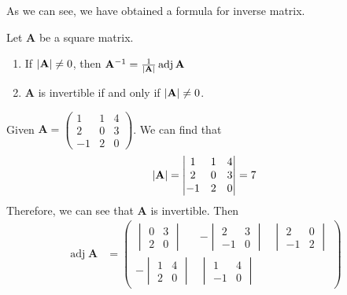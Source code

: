\documentclass{huhtakm-template-book}
\DeclareMathOperator{\adj}{adj}
\begin{document}
As we can see, we have obtained a formula for inverse matrix.
\begin{thm}
    Let $\mathbf{A}$ be a square matrix.
    \begin{enumerate}
        \item If $\left|{\mathbf{A}}\right|\neq 0$, then $\mathbf{A}^{-1}=\frac{1}{\abs{\mathbf{A}}}\adj\mathbf{A}$
        \item $\mathbf{A}$ is invertible if and only if $\left|{\mathbf{A}}\right|\neq 0$.
    \end{enumerate}
\end{thm}
\begin{eg}
    Given $\mathbf{A}=\begin{pmatrix}
        1 & 1 & 4\\
        2 & 0 & 3\\
        -1 & 2 & 0
    \end{pmatrix}$. We can find that
    \begin{equation*}
        \left|{\mathbf{A}}\right|=\begin{vmatrix}
        1 & 1 & 4\\
        2 & 0 & 3\\
        -1 & 2 & 0
        \end{vmatrix}=7
    \end{equation*}
    Therefore, we can see that $\mathbf{A}$ is invertible. Then
    \begin{align*}
        \adj\mathbf{A}&=\begin{pmatrix}
            \begin{vmatrix}
                0 & 3\\
                2 & 0
            \end{vmatrix} & -\begin{vmatrix}
                2 & 3\\
                -1 & 0
            \end{vmatrix} & \begin{vmatrix}
                2 & 0\\
                -1 & 2
            \end{vmatrix}\\
            -\begin{vmatrix}
                1 & 4\\
                2 & 0
            \end{vmatrix} & \begin{vmatrix}
                1 & 4\\
                -1 & 0

\end{vmatrix}
\end{pmatrix}
\end{align*}
\end{eg}
\end{document}
